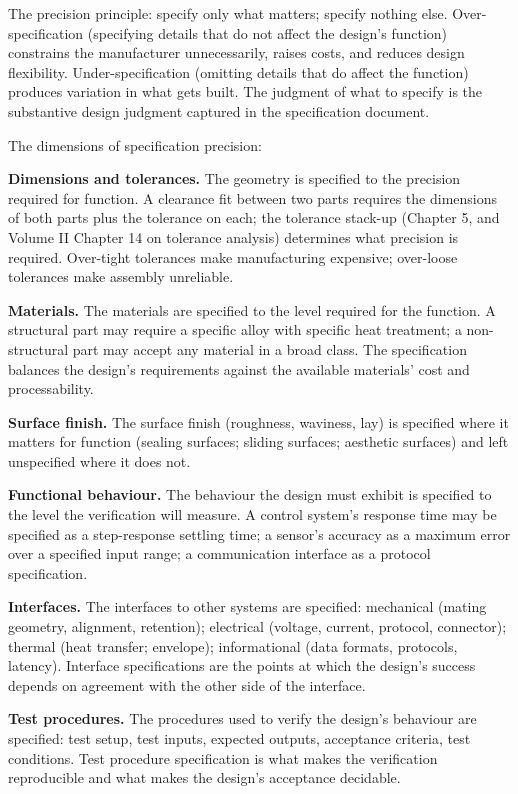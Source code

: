 The precision principle: specify only what matters; specify nothing else. Over-specification (specifying details that do not affect the design's function) constrains the manufacturer unnecessarily, raises costs, and reduces design flexibility. Under-specification (omitting details that do affect the function) produces variation in what gets built. The judgment of what to specify is the substantive design judgment captured in the specification document.

The dimensions of specification precision:

\textbf{Dimensions and tolerances.} The geometry is specified to the precision required for function. A clearance fit between two parts requires the dimensions of both parts plus the tolerance on each; the tolerance stack-up (Chapter 5, and Volume II Chapter 14 on tolerance analysis) determines what precision is required. Over-tight tolerances make manufacturing expensive; over-loose tolerances make assembly unreliable.

\textbf{Materials.} The materials are specified to the level required for the function. A structural part may require a specific alloy with specific heat treatment; a non-structural part may accept any material in a broad class. The specification balances the design's requirements against the available materials' cost and processability.

\textbf{Surface finish.} The surface finish (roughness, waviness, lay) is specified where it matters for function (sealing surfaces; sliding surfaces; aesthetic surfaces) and left unspecified where it does not.

\textbf{Functional behaviour.} The behaviour the design must exhibit is specified to the level the verification will measure. A control system's response time may be specified as a step-response settling time; a sensor's accuracy as a maximum error over a specified input range; a communication interface as a protocol specification.

\textbf{Interfaces.} The interfaces to other systems are specified: mechanical (mating geometry, alignment, retention); electrical (voltage, current, protocol, connector); thermal (heat transfer; envelope); informational (data formats, protocols, latency). Interface specifications are the points at which the design's success depends on agreement with the other side of the interface.

\textbf{Test procedures.} The procedures used to verify the design's behaviour are specified: test setup, test inputs, expected outputs, acceptance criteria, test conditions. Test procedure specification is what makes the verification reproducible and what makes the design's acceptance decidable.

